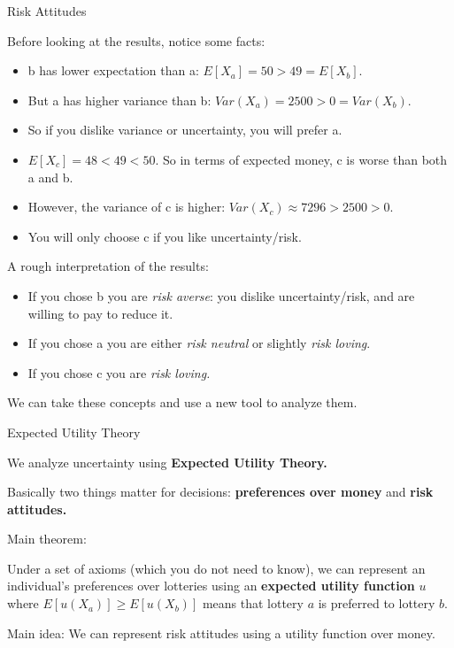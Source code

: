 \documentclass[aspectratio=169]{beamer}
\newenvironment{wideitemize}{\itemize\addtolength{\itemsep}{10pt}}{\enditemize}
\begin{document}
 \begin{frame}{Risk Attitudes}
    \begin{wideitemize}
        \item Before looking at the results, notice some facts:
        \begin{itemize}
            \item b has lower expectation than a: $E[X_a]=50>49=E[X_b]$. 
            \item But a has higher variance than b: $Var(X_a)=2500>0=Var(X_b)$.
            \item So if you dislike variance or uncertainty, you will prefer a.
            \item $E[X_c]=48<49<50$. So in terms of expected money, c is worse than both a and b.
            \item However, the variance of c is higher: $Var(X_c) \approx 7296>2500>0$.
            \item You will only choose c if you like uncertainty/risk.
        \end{itemize}
        \item A rough interpretation of the results:
        \begin{itemize}
            \item If you chose b you are \textit{risk averse}: you dislike uncertainty/risk, and are willing to pay to reduce it.
            \item If you chose a you are either \textit{risk neutral} or slightly \textit{risk loving}.
            \item If you chose c you are \textit{risk loving.}
        \end{itemize}
    \item We can take these concepts and use a new tool to analyze them.
    \end{wideitemize}
\end{frame}
 
 \begin{frame}{Expected Utility Theory}
 \begin{wideitemize}
     \item We analyze uncertainty using \textbf{Expected Utility Theory.}
     \item Basically two things matter for decisions: \textbf{preferences over money} and \textbf{risk attitudes.}
     \item Main theorem:
     
     \begin{theorem}
Under a set of axioms (which you do not need to know), we can represent an individual's preferences over lotteries using an \textbf{expected utility function} $u$ where $E[u(X_a)] \geq E[u(X_b)]$ means that lottery $a$ is preferred to lottery $b$.
\end{theorem}

\item Main idea: We can represent risk attitudes using a utility function over money.

 \end{wideitemize}
 \end{frame}
\end{document}
